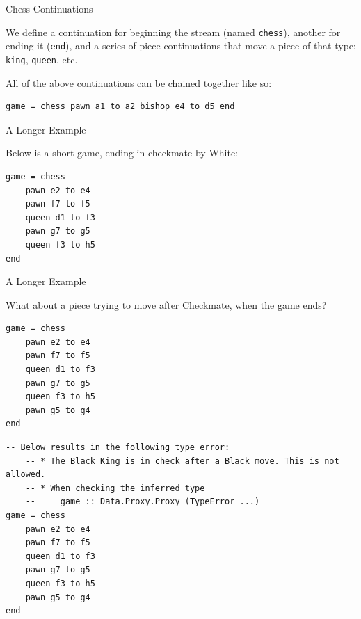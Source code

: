 \documentclass{beamer}
\newcommand{\inline}[1]{\lstinline[basicstyle=\ttfamily]{#1}}
\begin{document}
\begin{frame}[fragile]{Chess Continuations}

We define a continuation for beginning the stream (named \inline{chess}), another for ending it (\inline{end}), and a series of piece continuations that move a piece of that type; \inline{king}, \inline{queen}, etc.

All of the above continuations can be chained together like so:

\begin{lstlisting}
game = chess pawn a1 to a2 bishop e4 to d5 end
\end{lstlisting}

\end{frame}

\begin{frame}[fragile]{A Longer Example}

Below is a short game, ending in checkmate by White:

\begin{figure}[h]
    \centering
    \newgame
    \scalebox{0.55}{\showboard}
    \quad
    \scalebox{0.55}{\showboard}
    \label{threemovecheckmate}
\end{figure}

\pause

\begin{lstlisting}
game = chess
    pawn e2 to e4
    pawn f7 to f5
    queen d1 to f3
    pawn g7 to g5
    queen f3 to h5
end
\end{lstlisting}

\end{frame}

\begin{frame}[fragile]{A Longer Example}

What about a piece trying to move after Checkmate, when the game ends?

\begin{overprint}

\begin{lstlisting}
game = chess
    pawn e2 to e4
    pawn f7 to f5
    queen d1 to f3
    pawn g7 to g5
    queen f3 to h5
    pawn g5 to g4
end
\end{lstlisting}

\begin{lstlisting}
-- Below results in the following type error:
    -- * The Black King is in check after a Black move. This is not allowed.
    -- * When checking the inferred type
    --     game :: Data.Proxy.Proxy (TypeError ...)
game = chess
    pawn e2 to e4
    pawn f7 to f5
    queen d1 to f3
    pawn g7 to g5
    queen f3 to h5
    pawn g5 to g4
end
\end{lstlisting}

\end{overprint}

\end{frame}
\end{document}
